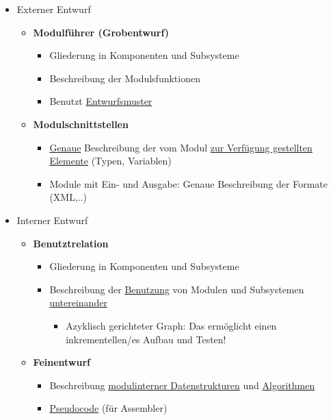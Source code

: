\documentclass[parskip=full, 12pt]{scrartcl}
\begin{document}
			\begin{itemize}
				\item Externer Entwurf
				\begin{itemize}
					\item \textbf{Modulführer (Grobentwurf)}
					\begin{itemize}
						\item Gliederung in Komponenten und Subsysteme
						\item Beschreibung der Modulsfunktionen
						\item Benutzt \underline{Entwurfsmuster}
					\end{itemize}
					\newpage
					\item \textbf{Modulschnittstellen}
					\begin{itemize}
						\item \underline{Genaue} Beschreibung der vom Modul \underline{zur Verfügung gestellten Elemente} (Typen, Variablen)
						\item Module mit Ein- und Ausgabe: Genaue Beschreibung der Formate (XML,..)
					\end{itemize}
				\end{itemize}
				\item Interner Entwurf
				\begin{itemize}
					\item \textbf{Benutztrelation}
					\begin{itemize}
						\item Gliederung in Komponenten und Subsysteme
						\item Beschreibung der \underline{Benutzung} von Modulen und Subsystemen \underline{untereinander}
						\begin{itemize}
							\item Azyklisch gerichteter Graph: Das ermöglicht einen inkrementellen/es Aufbau und Testen!
						\end{itemize}
					\end{itemize}
					\item \textbf{Feinentwurf}
					\begin{itemize}
						\item Beschreibung \underline{modulinterner Datenstrukturen} und \underline{Algorithmen}
						\item \underline{Pseudocode} (für Assembler)
					\end{itemize}
				\end{itemize}
			\end{itemize}
	
\end{document}

